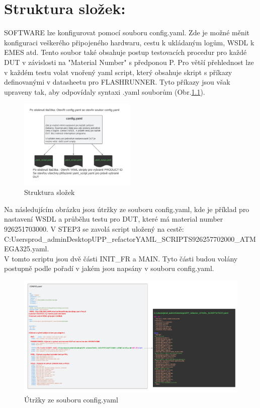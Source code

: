 \clearpage
\chapter{Struktura složek:}
SOFTWARE lze konfigurovat pomocí souboru config.yaml.
Zde je možné měnit konfiguraci veškerého připojeného hardwaru, cestu k ukládaným logům,
WSDL k EMES atd.
Tento soubor také obsahuje postup testovacích procedur pro každé DUT v závislosti na "Material Number" s předponou P.
Pro větší přehlednost lze v každém testu volat vnořený yaml script,
který obsahuje skript s příkazy definovanými v datasheetu pro FLASHRUNNER.
Tyto příkazy jsou však upraveny tak, aby odpovídaly syntaxi .yaml souborům
(Obr.\ref{fig:Útržky ze souboru config.yaml}).

\begin{figure}[ht!]
	\centering
	\includegraphics[width = 0.5\textwidth]{obrazky/Folder_diag.png}
    \caption{Struktura složek}
    
\end{figure}

Na následujícím  obrázku jsou útržky ze souboru config.yaml, kde je příklad pro nastavení WSDL a průběhu testu pro DUT,
které má material number 926251703000.
V STEP3 se zavolá script uložený na cestě:\\
\mbox{C:\/Users\/prod\_admin\/Desktop\/UPP\_refactor\/YAML\_SCRIPTS\/926257702000\_ATMEGA325.yaml}.\\
V tomto scriptu jsou dvě části INIT\_FR a MAIN. Tyto části budou volány postupně podle pořadí v jakém jsou napsány v souboru config.yaml. 

\begin{figure}[ht!]
	\centering
	\includegraphics[width = 1\textwidth]{obrazky/FOLDER_TEXT.png}
    \caption{Útržky ze souboru config.yaml}
    \label{fig:Útržky ze souboru config.yaml}
\end{figure}

